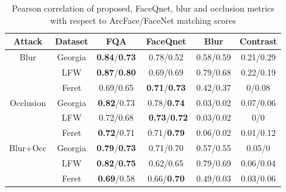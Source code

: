 \documentclass[runningheads]{llncs}
\begin{document}
\begin{table*}[!h]
\centering
    \caption{Pearson correlation of proposed, FaceQnet, blur and occlusion metrics with respect to ArcFace/FaceNet matching scores }
        \begin{tabular}{c c | c c c c}
            \toprule
            \midrule
                {Attack} & {Dataset} & {FQA} & {FaceQnet} & {Blur} & {Contrast}\\
                \hline
                \multirow{3}{*}{Blur} & Georgia & \textbf{0.84}/\textbf{0.73} & 0.78/0.52 & 0.58/0.59 & 0.21/0.29\\
               & LFW & \textbf{0.87}/\textbf{0.80} & 0.69/0.69 & 0.79/0.68 & 0.22/0.19\\
               & Feret & 0.69/0.65 & \textbf{0.71}/\textbf{0.73} & 0.42/0.37 & 0/0.08\\
                \hline
               \multirow{3}{*}{Occlusion} & Georgia & \textbf{0.82}/0.73 & 0.78/\textbf{0.74} & 0.03/0.02 & 0.07/0.06\\
              & LFW & 0.72/0.68 & \ \textbf{0.73}/\textbf{0.72} & 0.03/0.02 & 0/0\\
              & Feret & \textbf{0.72}/0.71 &  0.71/\textbf{0.79} & 0.06/0.02 & 0.01/0.12\\
                \hline
                \multirow{3}{*}{Blur+Occ} & Georgia & \textbf{0.79}/\textbf{0.73} & 0.71/0.70 & 0.57/0.55 & 0.05/0\\
                & LFW & \textbf{0.82}/\textbf{0.75} & 0.62/0.65 & 0.79/0.69 & 0.06/0.04\\
                & Feret & \textbf{0.69}/0.58 & 0.66/\textbf{0.70} & 0.49/0.03 & 0.03/0.06\\
            \midrule
            \bottomrule
        \end{tabular}
    \label{tab:sota_comparsion}
\centering
\end{table*}
\end{document}
